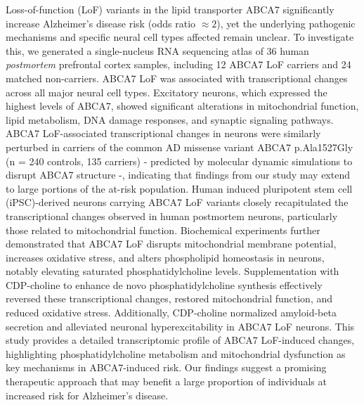 Loss-of-function (LoF) variants in the lipid transporter ABCA7 significantly increase Alzheimer's disease risk (odds ratio $\approx  2$), yet the underlying pathogenic mechanisms and specific neural cell types affected remain unclear. To investigate this, we generated a single-nucleus RNA sequencing atlas of 36 human \textit{postmortem} prefrontal cortex samples, including 12 ABCA7 LoF carriers and 24 matched non-carriers. ABCA7 LoF was associated with transcriptional changes across all major neural cell types. Excitatory neurons, which expressed the highest levels of ABCA7, showed significant alterations in mitochondrial function, lipid metabolism, DNA damage responses, and synaptic signaling pathways. ABCA7 LoF-associated transcriptional changes in neurons were similarly perturbed in carriers of the common AD missense variant ABCA7 p.Ala1527Gly (n = 240 controls, 135 carriers) - predicted by molecular dynamic simulations to disrupt ABCA7 structure -, indicating that findings from our study may extend to large portions of the at-risk population. Human induced pluripotent stem cell (iPSC)-derived neurons carrying ABCA7 LoF variants closely recapitulated the transcriptional changes observed in human postmortem neurons, particularly those related to mitochondrial function. Biochemical experiments further demonstrated that ABCA7 LoF disrupts mitochondrial membrane potential, increases oxidative stress, and alters phospholipid homeostasis in neurons, notably elevating saturated phosphatidylcholine levels. Supplementation with CDP-choline to enhance de novo phosphatidylcholine synthesis effectively reversed these transcriptional changes, restored mitochondrial function, and reduced oxidative stress. Additionally, CDP-choline normalized amyloid-beta secretion and alleviated neuronal hyperexcitability in ABCA7 LoF neurons. This study provides a detailed transcriptomic profile of ABCA7 LoF-induced changes, highlighting phosphatidylcholine metabolism and mitochondrial dysfunction as key mechanisms in ABCA7-induced risk. Our findings suggest a promising therapeutic approach that may benefit a large proportion of individuals at increased risk for Alzheimer's disease.

